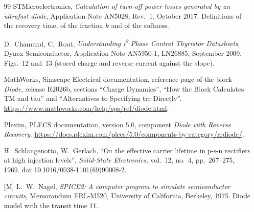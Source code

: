 \documentclass[10pt,a4paper]{scrartcl}
\begin{document}
\begin{thebibliography}{99}
STMicroelectronics, \emph{Calculation of turn-off power losses generated by an ultrafast diode}, Application Note AN5028, Rev.~1, October 2017. Definitions of the recovery time, of the fraction $k$ and of the softness.

D.~Chamund, C.~Rout, \emph{Understanding i\textsuperscript{2} Phase Control Thyristor Datasheets}, Dynex Semiconductor, Application Note AN5950-1, LN26885, September 2009. Figs.~12 and~13 (stored charge and reverse current against the slope).

MathWorks, Simscape Electrical documentation, reference page of the block \emph{Diode}, release R2026b, sections ``Charge Dynamics'', ``How the Block Calculates TM and tau'' and ``Alternatives to Specifying trr Directly''. \url{https://www.mathworks.com/help/sps/ref/diode.html}.

Plexim, PLECS documentation, version 5.0, component \emph{Diode with Reverse Recovery}. \url{https://docs.plexim.com/plecs/5.0/components-by-category/rrdiode/}.

H.~Schlangenotto, W.~Gerlach, ``On the effective carrier lifetime in p-s-n rectifiers at high injection levels'', \emph{Solid-State Electronics}, vol.~12, no.~4, pp.~267--275, 1969. doi:\,10.1016/0038-1101(69)90008-2.

[M] L.~W.~Nagel, \emph{SPICE2: A computer program to simulate semiconductor circuits}, Memorandum ERL-M520, University of California, Berkeley, 1975. Diode model with the transit time \texttt{TT}.

\end{thebibliography}
\end{document}
